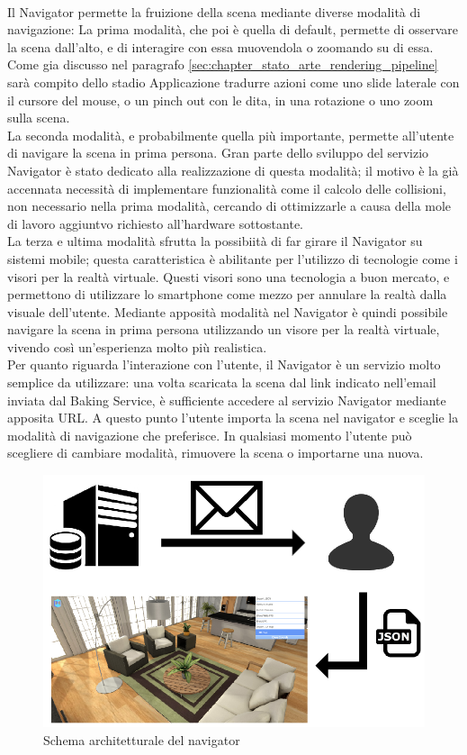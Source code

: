 \\
Il Navigator permette la fruizione della scena mediante diverse modalità di navigazione:
La prima modalità, che poi è quella di default, permette di osservare la scena dall’alto, e di interagire con essa muovendola o zoomando su di essa. Come gia discusso nel paragrafo \ref{sec:chapter_stato_arte_rendering_pipeline}  sarà compito dello stadio Applicazione tradurre azioni come uno slide laterale con il cursore del mouse, o un pinch out con le dita, in una rotazione o uno zoom sulla scena.
\\
La seconda modalità, e probabilmente quella più importante, permette all’utente di navigare la scena in prima persona. Gran parte dello sviluppo del servizio Navigator è stato dedicato alla realizzazione di questa modalità; il motivo è la già accennata necessità di implementare funzionalità come il calcolo delle collisioni, non necessario nella prima modalità, cercando di ottimizzarle a causa della mole di lavoro aggiuntvo richiesto all’hardware sottostante.
\\
La terza e ultima modalità sfrutta la possibiità di far girare il Navigator su sistemi mobile; questa caratteristica è abilitante per l’utilizzo di tecnologie come i visori per la realtà virtuale. Questi visori sono una tecnologia a buon mercato, e permettono di utilizzare lo smartphone come mezzo per annulare la realtà dalla visuale dell’utente. Mediante apposità modalità nel Navigator è quindi possibile navigare la scena in prima persona utilizzando un visore per la realtà virtuale, vivendo così un’esperienza molto più realistica. 
\\
Per quanto riguarda l’interazione con l’utente, il Navigator è un servizio molto semplice da utilizzare: una volta scaricata la scena dal link indicato nell’email inviata dal Baking Service, è sufficiente accedere al servizio Navigator mediante apposita URL. A questo punto l’utente importa la scena nel navigator e sceglie la modalità di navigazione che preferisce. In qualsiasi momento l’utente può scegliere di cambiare modalità, rimuovere la scena o importarne una nuova.
\\
\begin{figure}[htb]
 \centering
 \includegraphics[width=0.8\linewidth]{images/chapter_architettura_sistema/as_navigator.png}\hfill
 \caption[Schema architetturale navigator]{Schema architetturale del navigator}
 \label{fig:as_navigator}
\end{figure}

